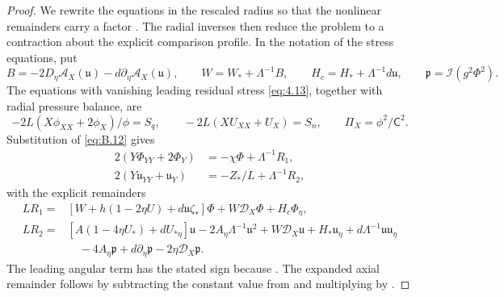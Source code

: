 \begin{proof}
We rewrite the equations in the rescaled radius so that the nonlinear remainders carry a factor
. The radial inverses then reduce the problem to a contraction
about the explicit comparison profile. In the notation of the stress equations, put
\begin{equation}
  B=-2D_\eta\mathcal A_X(\mathfrak u)-d\partial_\eta\mathcal A_X(\mathfrak u),
  \qquad W=W_*+\Lambda^{-1}B,
  \qquad H_c=H_*+\Lambda^{-1}d\mathfrak u,
  \qquad \mathfrak p=\mathcal I(g^2\Phi^2).
  \tag{B.14}\label{eq:B.14}
\end{equation}
The equations with vanishing leading residual stress \eqref{eq:4.13}, together with radial pressure
balance, are
\begin{equation}
  -2L(X\phi_{XX}+2\phi_X)/\phi=S_q,
  \qquad -2L(XU_{XX}+U_X)=S_n,
  \qquad \Pi_X=\phi^2/\mathsf C^2.
  \tag{B.15}\label{eq:B.15}
\end{equation}
Substitution of \eqref{eq:B.12} gives
\begin{align*}
  2(Y\Phi_{YY}+2\Phi_Y)&=-\chi\Phi+\Lambda^{-1}R_1,\\
  2(Y\mathfrak u_{YY}+\mathfrak u_Y)&=-Z_*/L+\Lambda^{-1}R_2,
\end{align*}
with the explicit remainders
\begin{align*}
  LR_1={}&[W+h(1-2\eta U)+d\mathfrak u\zeta_*]\Phi+W\mathcal D_X\Phi+H_c\Phi_\eta,\\
  LR_2={}&[A(1-4\eta U_*)+dU_{*\eta}]\mathfrak u-2A_\eta\Lambda^{-1}\mathfrak u^2
            +W\mathcal D_X\mathfrak u+H_*\mathfrak u_\eta+d\Lambda^{-1}\mathfrak u\mathfrak u_\eta\\
          &\quad-4A_\eta\mathfrak p+d\partial_\eta\mathfrak p-2\eta\mathcal D_X\mathfrak p.
\end{align*}
The leading angular term has the stated sign because
. The expanded axial remainder follows by
subtracting the constant value  from
and multiplying by .


\end{proof}
